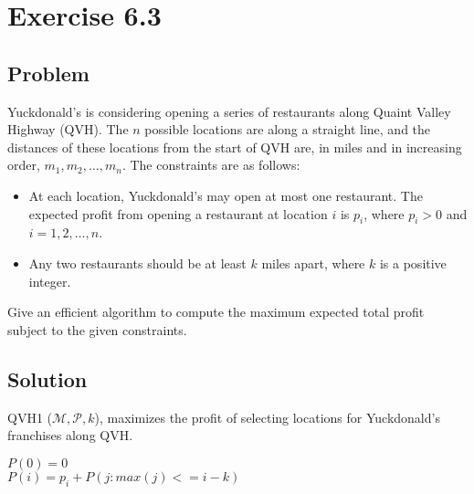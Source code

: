 \documentclass[12pt, letterpaper]{article}
\begin{document}
\section{Exercise 6.3}

\subsection{Problem}

Yuckdonald's is considering opening a series of restaurants along Quaint Valley Highway (QVH). The \(n\) possible locations are along a straight line, and the distances of these locations from the start of QVH are, in miles and in increasing order, \(m_1, m_2, \dots, m_n\). The constraints are as follows:

\begin{itemize}
    \item At each location, Yuckdonald's may open at most one restaurant. The expected profit from opening a restaurant at location \(i\) is \(p_i\), where \(p_i > 0\) and \(i = 1,2,\dots,n\).
    \item Any two restaurants should be at least \(k\) miles apart, where \(k\) is a positive integer.
\end{itemize}
    
Give an efficient algorithm to compute the maximum expected total profit subject to the given constraints.

\subsection{Solution}


\begin{algorithm}
    \caption{QVH1 (\(\mathcal{M, P}, k\)), maximizes the profit of selecting locations for Yuckdonald's franchises along QVH.}
    \(P(0) = 0\) \\
    {
        \(P(i) = p_i + P(j : max(j) <= i-k)\)
    }
\end{algorithm}
\end{document}
